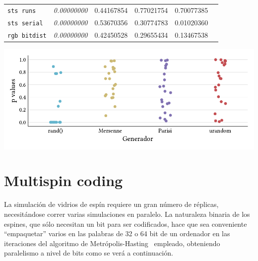 \documentclass[11pt]{report}
\begin{document}
\begin{appendices}
\begin{center}
\begin{tabular}{lccccc}
    \verb|sts runs|             & \textit{\textcolor{FAILED}{0.00000000}}   & \textcolor{PASSED}{0.44167854}            & \textcolor{PASSED}{0.77021754}            & \textcolor{PASSED}{0.70077385}            \\
    \verb|sts serial|           & \textit{\textcolor{FAILED}{0.00000000}}   & \textcolor{PASSED}{0.53670356}            & \textcolor{PASSED}{0.30774783}            & \textcolor{PASSED}{0.01020360}            \\
    \verb|rgb bitdist|          & \textit{\textcolor{FAILED}{0.00000000}}   & \textcolor{PASSED}{0.42450528}            & \textcolor{PASSED}{0.29655434}            & \textcolor{PASSED}{0.13467538}            \\
    \bottomrule
  \end{tabular}
\end{center}

\begin{center}
  \includegraphics{../study_cases/dieharder/summary.pdf}
\end{center}



\chapter{Multispin coding}
\label{chap:multispin}

La simulación de vidrios de espín requiere un gran número de réplicas,
necesitándose correr varias simulaciones en paralelo. La naturaleza
binaria de los espines, que sólo necesitan un bit para ser
codificados, hace que sea conveniente ``empaquetar'' varios en las
palabras de 32 o 64 bit de un ordenador en las iteraciones del
algoritmo de Metrópolis-Hasting~\cite{metropolis} empleado,
obteniendo paralelismo a nivel de bits como se verá a continuación.


\end{appendices}
\end{document}
